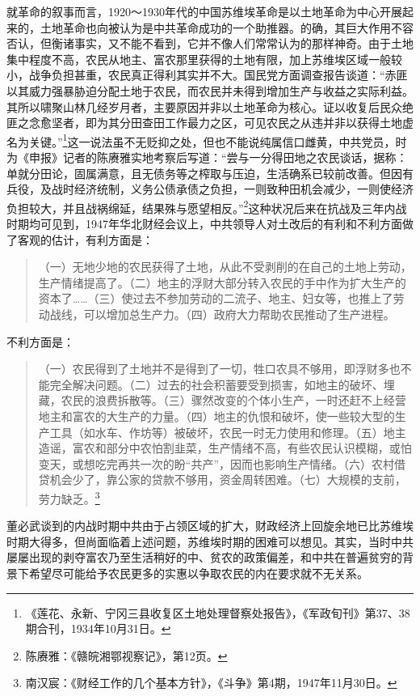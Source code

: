 就革命的叙事而言，1920～1930年代的中国苏维埃革命是以土地革命为中心开展起来的，土地革命也向被认为是中共革命成功的一个助推器。的确，其巨大作用不容否认，但衡诸事实，又不能不看到，它并不像人们常常认为的那样神奇。由于土地集中程度不高，农民从地主、富农那里获得的土地有限，加上苏维埃区域一般较小，战争负担甚重，农民真正得利其实并不大。国民党方面调查报告谈道：“赤匪以其威力强暴胁迫分配土地于农民，而农民并未得到增加生产与收益之实际利益。其所以啸聚山林几经岁月者，主要原因并非以土地革命为核心。证以收复后民众绝匪之念愈坚者，即为其分田查田工作最力之区，可见农民之从违并非以获得土地虚名为关键。”\footnote{《莲花、永新、宁冈三县收复区土地处理督察处报告》，《军政旬刊》第37、38期合刊，1934年10月31日。}这一说法虽不无贬抑之处，但也不能说纯属信口雌黄，中共党员，时为《申报》记者的陈赓雅实地考察后写道：“尝与一分得田地之农民谈话，据称：单就分田论，固属满意，且无债务等之榨取与压迫，生活确系已较前改善。但因有兵役，及战时经济统制，义务公债承债之负担，一则致种田机会减少，一则使经济负担较大，并且战祸绵延，结果殊与愿望相反。”\footnote{陈赓雅：《赣皖湘鄂视察记》，第12页。}这种状况后来在抗战及三年内战时期均可见到，1947年华北财经会议上，中共领导人对土改后的有利和不利方面做了客观的估计，有利方面是：

\begin{quote}

（一）无地少地的农民获得了土地，从此不受剥削的在自己的土地上劳动，生产情绪提高了。（二）地主的浮财大部分转入农民的手中作为扩大生产的资本了……（三）使过去不参加劳动的二流子、地主、妇女等，也推上了劳动战线，可以增加总生产力。（四）政府大力帮助农民推动了生产进程。
\end{quote}


不利方面是：

\begin{quote}

（一）农民得到了土地并不是得到了一切，牲口农具不够用，即浮财多也不能完全解决问题。（二）过去的社会积蓄要受到损害，如地主的破坏、埋藏，农民的浪费拆散等。（三）骤然改变的个体小生产，一时还赶不上经营地主和富农的大生产的力量。（四）地主的仇恨和破坏，使一些较大型的生产工具（如水车、作坊等）被破坏，农民一时无力使用和修理。（五）地主造谣，富农和部分中农怕割韭菜，生产情绪不高，有些农民认识模糊，或怕变天，或想吃完再共一次的盼“共产”，因而也影响生产情绪。（六）农村借贷机会少了，靠公家的贷款不够用，资金周转困难。（七）大规模的支前，劳力缺乏。\footnote{南汉宸：《财经工作的几个基本方针》，《斗争》第4期，1947年11月30日。}
\end{quote}


董必武谈到的内战时期中共由于占领区域的扩大，财政经济上回旋余地已比苏维埃时期大得多，但尚面临着上述问题，苏维埃时期的困难可以想见。其实，当时中共屡屡出现的剥夺富农乃至生活稍好的中、贫农的政策偏差，和中共在普遍贫穷的背景下希望尽可能给予农民更多的实惠以争取农民的内在要求就不无关系。


